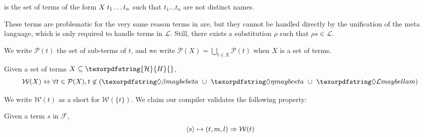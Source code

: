\documentclass[sigconf,natbib=false,review]{acmart}
\newcommand{\appsep}{\ensuremath{\textcolor{lightgray}{\cdot}}}
\newcommand{\llambda}{\ensuremath{\mathcal{L}}\xspace}
\newcommand{\Fo}{\texorpdfstring{\ensuremath{\mathcal{F}\xspace}}{F}} %
\newcommand{\Ho}{\texorpdfstring{\ensuremath{\mathcal{H}}\xspace}{H}}
\begin{document}
\begin{definition}[\notllambda]\label{def:notllambda}
  \notllambda is the set of terms of the form $X \appsep t_1 \ldots t_n$
  such that $t_1 \ldots t_n$ are not distinct names.
\end{definition}

\noindent
These terms are problematic for the very same reason terms in \maybebeta are,
but they cannot be handled directly by the unification of the meta language, which
is only required to handle terms in \llambda. Still, there exists a
substitution $\rho$ such that $\rho s \in \llambda$.


\newcommand{\subterm}[1]{\ensuremath{\mathcal{P}(#1)}}
We write $\subterm{t}$ the set of sub-terms of $t$, and
we write $\subterm{X} = \bigcup_{t\in X} \subterm{t}$ when $X$ is a set of terms.

\newcommand{\wellb}{\ensuremath{\mathcal{W}}\xspace}
\begin{definition}
Given a set of terms $X \subseteq \Ho{}$,
$$
\wellb(X) \Leftrightarrow \forall t \in \subterm{X},
t \not\in (\maybebeta{} ~\cup~ \maybeeta{} ~\cup~ \notllambda{})
$$
\end{definition}

\noindent
We write $\wellb(t)$ as a short for $\wellb(\{t\})$.
We claim our compiler validates the following property: 

\begin{proposition}[\wellb-enforcing]\label{prop:w-enforcing}
  Given a term $s$ in \Fo{}, 
  $$
    \C{s}{t}{m}{l} \Rightarrow \wellb(t)
  $$
\end{proposition}
\end{document}
